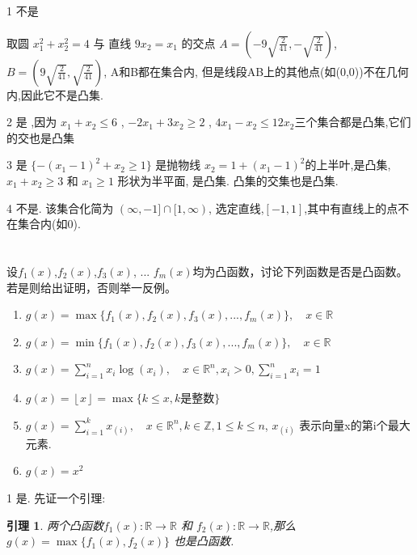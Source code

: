 \documentclass[a4paper]{article}
\newtheorem{lemma}[theorem]{\indent 引理}
\begin{document}
1 不是


取圆 $x_1^2 + x_2^2 = 4$ 与 直线 $9x_2 = x_1$ 的交点 $A  = (-9\sqrt{\frac{2}{41}},-\sqrt{\frac{2}{41}})$, $B = (9\sqrt{\frac{2}{41}},\sqrt{\frac{2}{41}})$, A和B都在集合内, 但是线段AB上的其他点(如(0,0))不在几何内,因此它不是凸集.

2 是 ,因为 $x_1 + x_2 \leq 6$ , $-2 x_1 + 3x_2 \geq 2$ , $4x_1 - x_2 \leq 12 x_2$三个集合都是凸集,它们的交也是凸集

3 是 $\{-(x_1 -1)^2 + x_2 \geq 1\}$ 是抛物线 $ x_2 = 1 + (x_1 - 1)^2$的上半叶,是凸集, $x_1 + x_2 \geq 3$ 和 $x_1 \geq 1$ 形状为半平面, 是凸集. 凸集的交集也是凸集.

4 不是. 该集合化简为 $(\infty,-1] \cap [1,\infty)$, 选定直线,$[-1,1]$,其中有直线上的点不在集合内(如0).


\section{}
设$f_1(x)$,$f_2(x)$,$f_3(x)$, ... $f_m(x)$均为凸函数，讨论下列函数是否是凸函数。若是则给出证明，否则举一反例。

\begin{enumerate}
    \item $g(x) = \max \{f_1(x), f_2(x), f_3(x) , ... , f_m(x)\} , \quad x \in \mathbb{R}$
    \item $g(x) = \min \{f_1(x), f_2(x), f_3(x) , ... , f_m(x)\} , \quad x \in \mathbb{R}$
    \item $g(x) = \sum_{i=1}^{n} x_i \log(x_i),\quad x \in \mathbb{R}^n, x_i > 0, \sum_{i=1}^n x_i = 1$
    \item $g(x) = \left\lfloor x \right\rfloor = \max\{k \leq x, k \text{是整数}\}$
    \item $g(x) = \sum_{i=1}^{k} x_{(i)}, \quad x \in \mathbb{R}^n , k \in \mathbb{Z}, 1 \leq k \leq n $, $x_{(i)}$ 表示向量x的第i个最大元素.
    \item $g(x) = x^2$
\end{enumerate}

1 是. 先证一个引理: 

\begin{lemma}
两个凸函数$f_1(x) : \mathbb{R} \rightarrow \mathbb{R}$ 和 $f_2(x): \mathbb{R} \rightarrow \mathbb{R}$,那么 $g(x) = \max \{f_1(x),f_2(x)\}$ 也是凸函数.
\end{lemma} 
\end{document}
